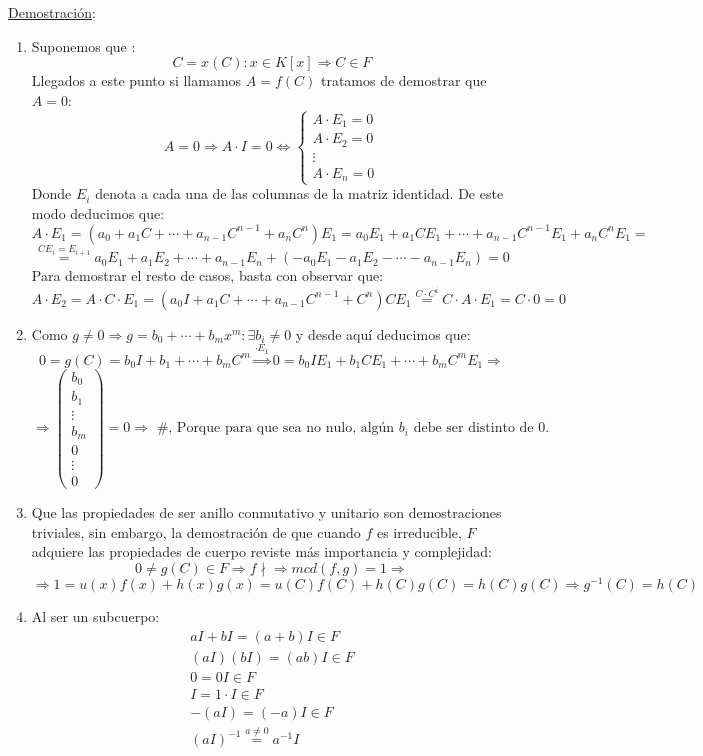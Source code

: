 \documentclass[10pt,a4paper,openright]{book}
\begin{document}
\underline{Demostración}:
\begin{enumerate}
\item Suponemos que :
$$C=x(C): x\in K[x]\Rightarrow C\in F$$
Llegados a este punto si llamamos $A=f(C)$ tratamos de demostrar que $A=0$:
$$A=0\Rightarrow A\cdot I=0\Leftrightarrow \begin{cases}
A\cdot E_1=0 \\
A\cdot E_2=0 \\
\vdots \\
A\cdot E_n=0
\end{cases}$$
Donde $E_i$ denota a cada una de las columnas de la matriz identidad. De este modo deducimos que:
$$A\cdot E_1=(a_0+a_1C+\cdots +a_{n-1}C^{n-1}+a_nC^n)E_1=a_0E_1+a_1CE_1+\cdots +a_{n-1}C^{n-1}E_1+a_nC^nE_1=$$
$$\stackrel{CE_i=E_{i+1}}=a_0E_1+a_1E_2+\cdots +a_{n-1}E_n+(-a_0E_1-a_1E_2-\cdots -a_{n-1}E_n)=0$$
Para demostrar el resto de casos, basta con observar que:
$$A\cdot E_2=A\cdot C\cdot E_1=(a_0I+a_1C+\cdots+ a_{n-1}C^{n-1}+C^n)CE_1\stackrel{C\cdot C^{i}}{=}C\cdot A\cdot E_1=C\cdot 0=0$$

\item Como $g\neq 0\Rightarrow g=b_0+\cdots+b_mx^m: \exists b_i\neq 0$ y desde aquí deducimos que:
$$0=g(C)=b_0I+b_1+\cdots +b_mC^m\stackrel{\cdot E_1}{\Rightarrow} 0=b_0IE_1+b_1CE_1+\cdots+b_mC^mE_1\Rightarrow$$
$$\Rightarrow \left(\begin{array}{c}
b_0 \\
b_1 \\
\vdots \\
b_m \\
0 \\
\vdots \\
0
\end{array}\right)=0\Rightarrow \mbox{ \#, Porque para que sea no nulo, algún $b_i$ debe ser distinto de 0.}
$$

\item Que las propiedades de ser anillo conmutativo y unitario son demostraciones triviales, sin embargo, la demostración de que cuando $f$ es irreducible, $F$ adquiere las propiedades de cuerpo reviste más importancia y complejidad:
$$0\neq g(C)\in F\Rightarrow f\nmid\Rightarrow mcd(f,g)=1\Rightarrow$$
$$\Rightarrow 1=u(x)f(x)+h(x)g(x)=u(C)f(C)+h(C)g(C)=h(C)g(C)\Rightarrow g^{-1}(C)=h(C)$$

\item Al ser un subcuerpo:
\begin{gather*}
aI+bI=(a+b)I\in F \\
(aI)(bI)=(ab)I\in F \\
0=0I\in F \\
I=1\cdot I\in F \\
-(aI)=(-a)I\in F \\
(aI)^{-1}\stackrel{a\neq 0}{=}a^{-1}I \\
\end{gather*}


\end{enumerate}
\end{document}
